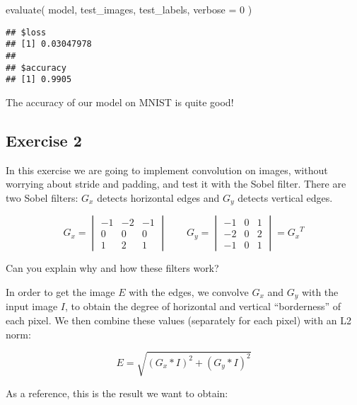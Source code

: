 \documentclass[
  a4paper,
]{article}
\newenvironment{Shaded}{\begin{snugshade}}{\end{snugshade}}
\newcommand{\AttributeTok}[1]{\textcolor[rgb]{0.77,0.63,0.00}{#1}}
\newcommand{\DecValTok}[1]{\textcolor[rgb]{0.00,0.00,0.81}{#1}}
\newcommand{\FunctionTok}[1]{\textcolor[rgb]{0.00,0.00,0.00}{#1}}
\newcommand{\NormalTok}[1]{#1}
\begin{document}
\begin{Shaded}
\begin{Highlighting}[]
\FunctionTok{evaluate}\NormalTok{(}
\NormalTok{  model, test\_images, test\_labels,}
  \AttributeTok{verbose =} \DecValTok{0}
\NormalTok{)}
\end{Highlighting}
\end{Shaded}

\begin{verbatim}
## $loss
## [1] 0.03047978
## 
## $accuracy
## [1] 0.9905
\end{verbatim}

The accuracy of our model on MNIST is quite good!

\hypertarget{exercise-2}{%
\subsection{Exercise 2}\label{exercise-2}}

In this exercise we are going to implement convolution on images,
without worrying about stride and padding, and test it with the Sobel
filter. There are two Sobel filters: \(G_x\) detects horizontal edges
and \(G_y\) detects vertical edges.

\begin{equation}
G_x=\begin{vmatrix}
-1 & -2 & -1 \\
0 & 0 & 0 \\
1 & 2 & 1
\end{vmatrix}
\qquad
G_y=\begin{vmatrix}
-1 & 0 & 1 \\
-2 & 0 & 2 \\
-1 & 0 & 1
\end{vmatrix}={G_x}^T
\end{equation}

Can you explain why and how these filters work?

In order to get the image \(E\) with the edges, we convolve \(G_x\) and
\(G_y\) with the input image \(I\), to obtain the degree of horizontal
and vertical ``borderness'' of each pixel. We then combine these values
(separately for each pixel) with an L2 norm:

\begin{equation}
E=\sqrt{(G_x*I)^2+(G_y*I)^2}
\end{equation}

As a reference, this is the result we want to obtain:
\end{document}
